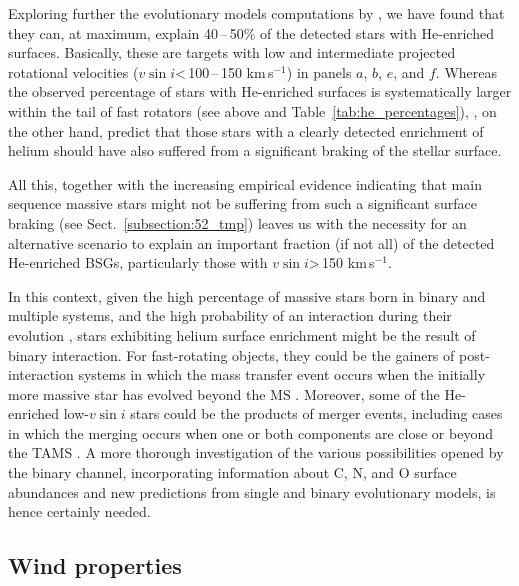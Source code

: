 \documentclass{aa}
\newcommand{\vsini}{\mbox{$v\sin i$}\xspace}
\newcommand{\kms}{\,\mbox{km\,s$^{-1}$}\xspace}
\begin{document}
Exploring further the evolutionary models computations by \citet{ekstrom12}, we have found that they can, at maximum, explain 40\,--\,50\% of the detected stars with He-enriched surfaces. Basically, these are targets with low and intermediate projected rotational velocities (\vsini<\,100\,--\,150\,\kms) in panels $a$, $b$, $e$, and $f$. Whereas the observed percentage of stars with He-enriched surfaces is systematically larger within the tail of fast rotators (see above and Table~\ref{tab:he_percentages}), \citet{ekstrom12}, on the other hand, predict that those stars with a clearly detected enrichment of helium should have also suffered from a significant braking of the stellar surface.

All this, together with the increasing empirical evidence indicating that main sequence massive stars might not be suffering from such a significant surface braking (see Sect.~\ref{subsection:52_tmp}) leaves us with the necessity for an alternative scenario to explain an important fraction (if not all) of the detected He-enriched BSGs, particularly those with \vsini>\,150\,\kms.

In this context, given the high percentage of massive stars born in binary and multiple systems, and the high probability of an interaction during their evolution \citep[see][and references therein]{marchant23}, stars exhibiting helium surface enrichment might be the result of binary interaction. For fast-rotating objects, they could be the gainers of post-interaction systems in which the mass transfer event occurs when the initially more massive star has evolved beyond the MS \citep[i.e. case B mass transfer][]{langer20, wang20, klencki20, sen22}. Moreover, some of the He-enriched low-\vsini stars could be the products of merger events, including cases in which the merging occurs when one or both components are close or beyond the TAMS \citep[see][]{podsiadlowski92, langer12, schneider16}. A more thorough investigation of the various possibilities opened by the binary channel, incorporating information about C, N, and O surface abundances and new predictions from single and binary evolutionary models, is hence certainly needed.  




\subsection{Wind properties}
\label{subsection:55_tmp}
\end{document}
